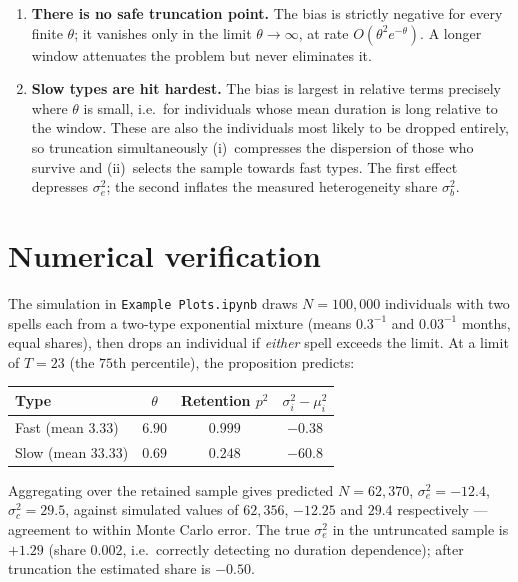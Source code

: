 \documentclass[11pt,a4paper]{article}
\begin{document}
\begin{enumerate}[leftmargin=*]
\item \textbf{There is no safe truncation point.}  The bias is strictly
negative for every finite $\theta$; it vanishes only in the limit
$\theta \to \infty$, at rate $O(\theta^2 e^{-\theta})$.  A longer window
attenuates the problem but never eliminates it.

\item \textbf{Slow types are hit hardest.}  The bias is largest in relative
terms precisely where $\theta$ is small, i.e.\ for individuals whose mean
duration is long relative to the window.  These are also the individuals most
likely to be dropped entirely, so truncation simultaneously (i)~compresses
the dispersion of those who survive and (ii)~selects the sample towards fast
types.  The first effect depresses $\sigma^2_e$; the second inflates the
measured heterogeneity share $\sigma^2_b$.
\end{enumerate}

\section{Numerical verification}

The simulation in \texttt{Example Plots.ipynb} draws $N = 100{,}000$
individuals with two spells each from a two-type exponential mixture (means
$0.3^{-1}$ and $0.03^{-1}$ months, equal shares), then drops an individual if
\emph{either} spell exceeds the limit.  At a limit of $T = 23$ (the $75$th
percentile), the proposition predicts:

\begin{center}
\begin{tabular}{lccc}
\toprule
Type & $\theta$ & Retention $p^2$ & $\sigma^2_i - \mu_i^2$ \\
\midrule
Fast (mean $3.33$)  & $6.90$ & $0.999$ & $-0.38$ \\
Slow (mean $33.33$) & $0.69$ & $0.248$ & $-60.8$ \\
\bottomrule
\end{tabular}
\end{center}

\noindent
Aggregating over the retained sample gives predicted
$N = 62{,}370$, $\sigma^2_e = -12.4$, $\sigma^2_c = 29.5$, against simulated
values of $62{,}356$, $-12.25$ and $29.4$ respectively --- agreement to
within Monte Carlo error.  The true $\sigma^2_e$ in the untruncated sample is
$+1.29$ (share $0.002$, i.e.\ correctly detecting no duration dependence);
after truncation the estimated share is $-0.50$.
\end{document}
